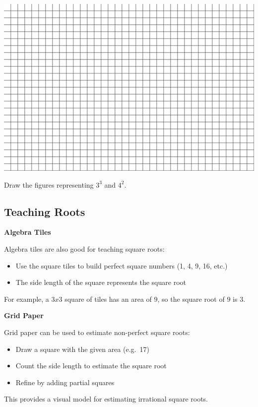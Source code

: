 \documentclass[
  letterpaper,
  DIV=11,
  numbers=noendperiod]{scrartcl}
\providecommand{\tightlist}{%
  \setlength{\itemsep}{0pt}\setlength{\parskip}{0pt}}\usepackage{longtable,booktabs,array}
\begin{document}
\includegraphics{../img/mod03/grid-paper.jpg}

Draw the figures representing \(3^3\) and \(4^2\).

\subsection{Teaching Roots}\label{teaching-roots}

\textbf{Algebra Tiles}

Algebra tiles are also good for teaching square roots:

\begin{itemize}
\tightlist
\item
  Use the square tiles to build perfect square numbers (1, 4, 9, 16,
  etc.)
\item
  The side length of the square represents the square root
\end{itemize}

For example, a \(3x3\) square of tiles has an area of \(9\), so the
square root of \(9\) is \(3\).

\textbf{Grid Paper}

Grid paper can be used to estimate non-perfect square roots:

\begin{itemize}
\tightlist
\item
  Draw a square with the given area (e.g.~17)
\item
  Count the side length to estimate the square root
\item
  Refine by adding partial squares
\end{itemize}

This provides a visual model for estimating irrational square roots.
\end{document}
